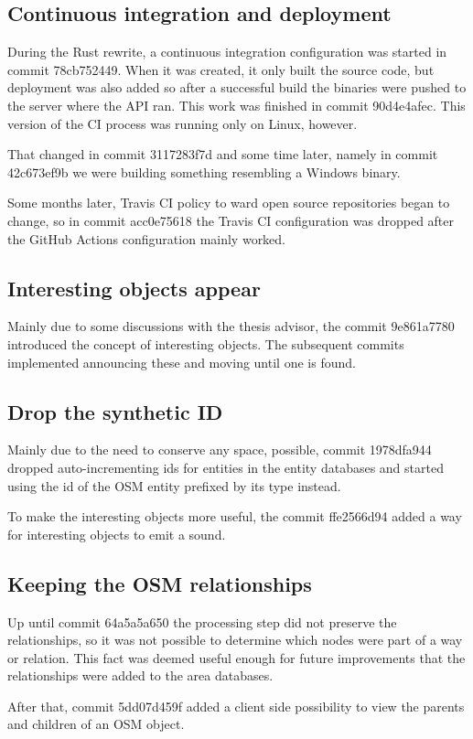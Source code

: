 \documentclass[nolof,digital]{fithesis3}
\begin{document}
\subsection{Continuous integration and deployment}
During the Rust rewrite, a continuous integration configuration was started in commit 78cb752449. When it was created, it only built the source code, but deployment was also added so after a successful build the binaries were pushed to the server where the API ran. This work was finished in commit 90d4e4afec. This version of the CI process was running only on Linux, however.

That changed in commit 3117283f7d and some time later, namely in commit 42c673ef9b we were building something resembling a Windows binary.

Some months later, Travis CI policy to ward open source repositories began to change, so in commit acc0e75618 the Travis CI configuration was dropped after the GitHub Actions configuration mainly worked.
\subsection{Interesting objects appear}
Mainly due to some discussions with the thesis advisor, the commit 9e861a7780 introduced the concept of interesting objects. The subsequent commits implemented announcing these and moving until one is found.
\subsection{Drop the synthetic ID}
Mainly due to the need to conserve any space, possible, commit 1978dfa944 dropped auto-incrementing ids for entities in the entity databases and started using the id of the OSM entity prefixed by its type instead.

To make the interesting objects more useful, the commit ffe2566d94 added a way for interesting objects to emit a sound.
\subsection{Keeping the OSM relationships}
Up until commit 64a5a5a650 the processing step did not preserve the relationships, so it was not possible to determine which nodes were part of a way or relation. This fact was deemed useful enough for future improvements that the relationships were added to the area databases.

After that, commit 5dd07d459f added a client side possibility to view the parents and children of an OSM object.
\end{document}
